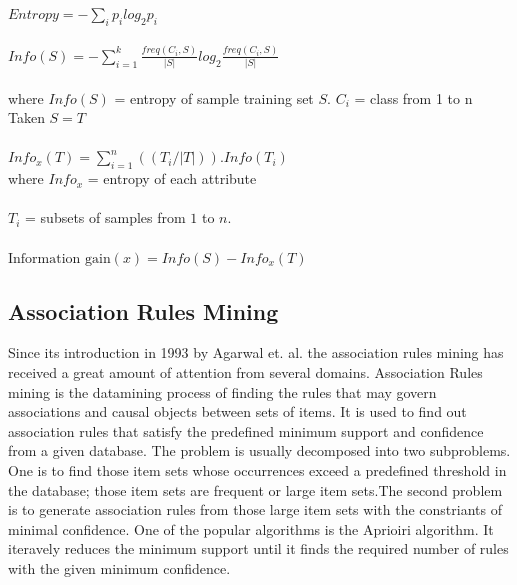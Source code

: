 \documentclass[conference]{IEEEtran}
\begin{document}
$Entropy = - \sum_{i}p_{i} log_{2} p_{i}$
\\ \\
$Info(S)= - \sum_{i=1}^{k} \frac{freq (C_{i},S)}{|S|} log_{2}\frac{freq(C_{i},S)}{|S|}$
\\ \\where $Info(S)$ = entropy of sample training set $S$.
                        $C_{i}$ = class from 1 to n
Taken $ S=T$ 
\\ \\
$Info_{x}(T)=\sum_{i=1}^{n}((T_{i}/|T|)).Info(T_{i})$
\\
where $Info_{x}$ = entropy of each attribute
\\ \\ $T_{i}$ = subsets of samples from $1$ to $n$.
 \\ \\
$ \mbox{Information gain} (x)= Info(S) - Info_{x}(T)$


\subsection{Association Rules Mining}
Since its introduction in 1993 by Agarwal et. al.\cite{IEEEhowto:agarwal} the association rules mining has received a great amount of attention from several domains. Association Rules mining is the datamining process of finding the rules that may govern associations and causal objects between sets of items. It is used to find out association rules that satisfy the predefined minimum support and confidence from a given database. The problem is usually decomposed into two subproblems. One is to find those item sets whose occurrences exceed a predefined threshold in the database; those item sets are frequent or large item sets.The second problem is to generate association rules from those large item sets with the constriants of minimal confidence. One of the popular algorithms is the Aprioiri algorithm. It iteravely reduces the minimum support until it finds the required number of rules with the given minimum confidence.
\end{document}
